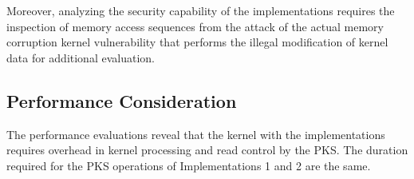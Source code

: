 %  
Moreover, analyzing the security capability of the implementations requires the
inspection of memory access sequences from the attack of the actual memory
corruption kernel vulnerability that performs the illegal modification of kernel
data for additional evaluation.
%
%
%




%

\subsection{Performance Consideration}
The performance evaluations reveal that the kernel with the
implementations requires overhead in kernel processing and read control by the
PKS. The duration required for the PKS operations of Implementations 1 and 2 are
the same.

